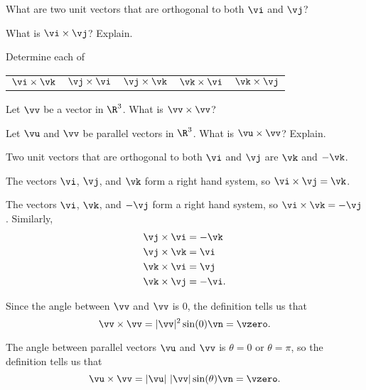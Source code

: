 \begin{activity} \label{A:9.4.1}  	
\ba
	\item What are two unit vectors that are orthogonal to both $\vi$ and $\vj$?
	
	
	
	\item What is $\vi \times \vj$? Explain.
	
	
	

	\item Determine each of
\begin{center}
\begin{tabular}{ccccc}
$\vi \times \vk$	&$\vj \times \vi$	&$\vj \times \vk$	&$\vk \times \vi$	&$\vk \times \vj$	\\
\end{tabular}
\end{center}



	\item Let $\vv$ be a vector in $\R^3$. What is $\vv \times \vv$?
	
	
	
	\item Let $\vu$ and $\vv$ be parallel vectors in $\R^3$. What is $\vu \times \vv$? Explain.
	
	
	
	\ea
\end{activity}
\begin{smallhint}

\end{smallhint}
\begin{bighint}

\end{bighint}
\begin{activitySolution}
\ba
	\item Two unit vectors that are orthogonal to both $\vi$ and $\vj$ are $\vk$ and $-\vk$. 
	\item The vectors $\vi$, $\vj$, and $\vk$ form a right hand system, so $\vi \times \vj = \vk$. 
	\item The vectors $\vi$, $\vk$, and $-\vj$ form a right hand system, so $\vi \times \vk = -\vj$. Similarly,
	\begin{align*}
	\vj \times \vi &= -\vk \\
	\vj \times \vk &= \vi \\
	\vk \times \vi &= \vj \\
	\vk \times \vj &= -\vi.
	\end{align*}
	\item Since the angle between $\vv$ and $\vv$ is $0$, the definition tells us that 
\[\vv \times \vv = |\vv|^2 \sin(0) \vn = \vzero.\]
	\item The angle between parallel vectors $\vu$ and $\vv$ is $\theta=0$ or $\theta=\pi$, so the definition tells us that 
\[\vu \times \vv = |\vu| \ |\vv| \sin(\theta) \vn = \vzero.\]
	\ea
\end{activitySolution}
\aftera

